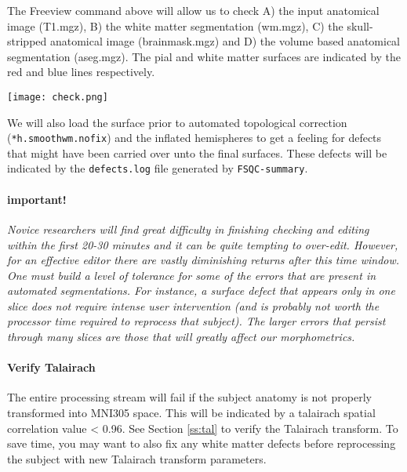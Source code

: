 \documentclass[paper=a4, fontsize=11pt]{scrartcl} %
\numberwithin{equation}{section} %
\numberwithin{figure}{section} %
\numberwithin{table}{section} %
\begin{document}
The Freeview command above will allow us to check A) the input anatomical image (T1.mgz), B) the white matter segmentation (wm.mgz), C) the skull-stripped anatomical image (brainmask.mgz) and D) the volume based anatomical segmentation (aseg.mgz).  The pial and white matter surfaces are indicated by the red and blue lines respectively.  

\texttt{[image: check.png]}

We will also load the surface prior to automated topological correction (\texttt{*h.smoothwm.nofix}) and the inflated hemispheres to get a feeling for defects that might have been carried over unto the final surfaces.  These defects will be indicated by the \texttt{defects.log} file generated by \texttt{FSQC-summary}.

\paragraph{important!} \textit{Novice researchers will find great difficulty in finishing checking and editing within the first 20-30 minutes and it can be quite tempting to over-edit.  However, for an effective editor there are vastly diminishing returns after this time window.  One must build a level of tolerance for some of the errors that are present in automated segmentations.  For instance, a surface defect that appears only in one slice does not require intense user intervention (and is probably not worth the processor time required to reprocess that subject).  The larger errors that persist through many slices are those that will greatly affect our morphometrics.}

\paragraph{Verify Talairach}  The entire processing stream will fail if the subject anatomy is not properly transformed into MNI305 space. This will be indicated by a talairach spatial correlation value < 0.96. See Section \ref{ss:tal} to verify the Talairach transform.  To save time, you may want to also fix any white matter defects before reprocessing the subject with new Talairach transform parameters.
\end{document}
